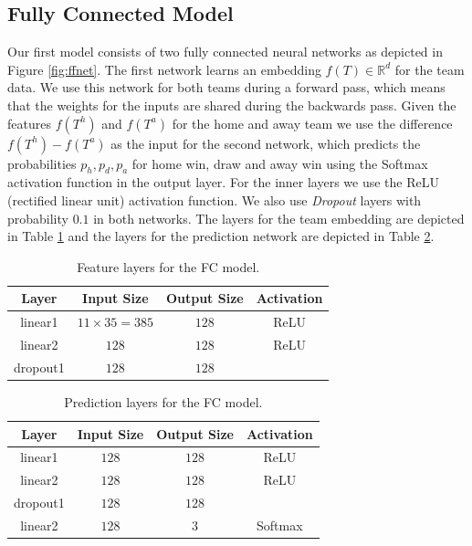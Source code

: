 \documentclass[a4paper]{article}
\begin{document}
\subsection{Fully Connected Model}
Our first model consists of two fully connected neural networks as depicted in
Figure \ref{fig:ffnet}. The first network learns an embedding $f(T) \in
\mathbb{R}^d $ for the team data. We use this network for both teams during a
forward pass, which means that the weights for the inputs are shared during the
backwards pass. Given the features $f(T^h)$ and $f(T^a)$ for the home and away
team we use the difference $f(T^h)-f(T^a)$ as the input for the second network,
which predicts the probabilities $p_h, p_d, p_a$ for home win, draw and away win
using the Softmax activation function in the output layer. For the inner layers
we use the ReLU (rectified linear unit) activation function. We also use
\textit{Dropout} \cite{Dropout14} layers with probability $0.1$ in both
networks. The layers for the team embedding are depicted in Table
\ref{tab:flayer} and the layers for the prediction network are depicted in Table
\ref{tab:player}.
 
\begin{table}
\begin{tabular}{|c|c|c|c|}
\hline 
\textbf{Layer} & \textbf{Input Size} & \textbf{Output Size} & \textbf{Activation} \\ 
\hline 	
\hline
linear1 & $11 \times 35=385$ & $128$ & ReLU \\ 
\hline 
linear2 & $128$ & $128$ & ReLU \\ 
\hline 
dropout1 & $128$ & $128$ &  \\ 
\hline 
\end{tabular} 
\caption{Feature layers for the FC model.}
\label{tab:flayer}
\end{table}

\begin{table}
\begin{tabular}{|c|c|c|c|}
\hline 
\textbf{Layer} & \textbf{Input Size} & \textbf{Output Size} & \textbf{Activation} \\ 
\hline 	
\hline
linear1 & $128$ & $128$ & ReLU \\ 
\hline 
linear2 & $128$ & $128$ & ReLU \\ 
\hline 
dropout1 & $128$ & $128$ &  \\ 
\hline 
linear2 & $128$ & $3$ & Softmax \\ 
\hline
\end{tabular} 
\caption{Prediction layers for the FC model.}
\label{tab:player}
\end{table}
\end{document}
